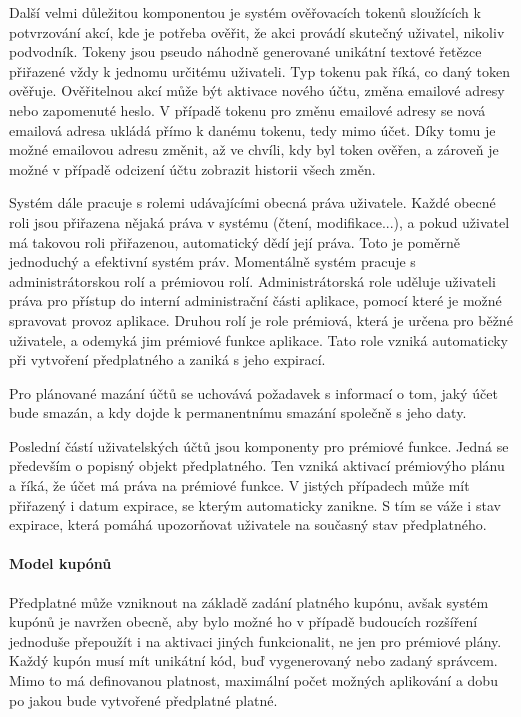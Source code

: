 		Další velmi důležitou komponentou je systém ověřovacích tokenů sloužících k potvrzování akcí, kde
		je potřeba ověřit, že akci provádí skutečný uživatel, nikoliv podvodník.
		Tokeny jsou pseudo náhodně generované unikátní textové řetězce přiřazené vždy k jednomu určitému uživateli.
		Typ tokenu pak říká, co daný token ověřuje.
		Ověřitelnou akcí může být aktivace nového účtu, změna emailové adresy nebo zapomenuté heslo.
		V případě tokenu pro změnu emailové adresy se nová emailová adresa ukládá přímo k danému tokenu, tedy mimo účet.
		Díky tomu je možné emailovou adresu změnit, až ve chvíli, kdy byl token ověřen, a zároveň je možné v případě
		odcizení účtu zobrazit historii všech změn.

		Systém dále pracuje s rolemi udávajícími obecná práva uživatele.
		Každé obecné roli jsou přiřazena nějaká práva v systému (čtení, modifikace...), a pokud uživatel má takovou roli
		přiřazenou, automatický dědí její práva.
		Toto je poměrně jednoduchý a efektivní systém práv.
		Momentálně systém pracuje s administrátorskou rolí a prémiovou rolí.
		Administrátorská role uděluje uživateli práva pro přístup do interní administrační části
		aplikace, pomocí které je možné spravovat provoz aplikace.
		Druhou rolí je role prémiová, která je určena pro běžné uživatele, a odemyká jim prémiové funkce aplikace.
		Tato role vzniká automaticky při vytvoření předplatného a zaniká s jeho expirací.

		Pro plánované mazání účtů se uchovává požadavek s informací o tom, jaký účet bude smazán, a kdy dojde k permanentnímu
		smazání společně s jeho daty.

		Poslední částí uživatelských účtů jsou komponenty pro prémiové funkce.
		Jedná se především o popisný objekt předplatného.
		Ten vzniká aktivací prémiovýho plánu a říká, že účet má práva na prémiové funkce.
		V jistých případech může mít přiřazený i datum expirace, se kterým automaticky zanikne.
		S tím se váže i stav expirace, která pomáhá upozorňovat uživatele na současný stav předplatného.

		\paragraph{Model kupónů}

		Předplatné může vzniknout na základě zadání platného kupónu, avšak systém kupónů je navržen obecně, aby
		bylo možné ho v případě budoucích rozšíření jednoduše přepoužít i na aktivaci jiných funkcionalit, ne jen
		pro prémiové plány.
		Každý kupón musí mít unikátní kód, buď vygenerovaný nebo zadaný správcem.
		Mimo to má definovanou platnost, maximální počet možných aplikování a dobu po jakou bude vytvořené předplatné platné.

